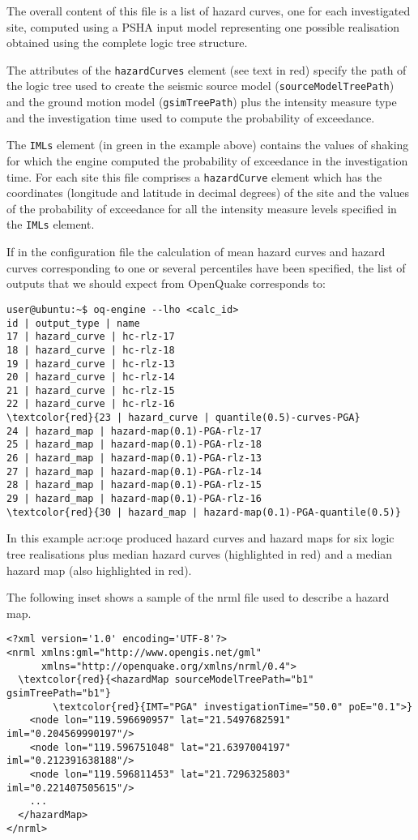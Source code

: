 The overall content of this file is a list of hazard curves, one for
each investigated site, computed using a PSHA input model representing
one possible realisation obtained using the complete logic tree structure. 

The attributes of the \texttt{hazardCurves} element (see text in 
red) specify the path of the logic tree 
used to create the seismic source model (\texttt{source\-Model\-TreePath}) 
and the ground motion model (\texttt{gsim\-Tree\-Path}) plus the 
intensity measure type and the investigation time used to compute 
the probability of exceedance. 

The \texttt{IMLs} element (in green in the example above) contains the 
values of shaking for which the engine computed the probability of 
exceedance in the investigation time.
For each site this file comprises a \texttt{hazardCurve} element which 
has the coordinates (longitude and latitude in decimal degrees) 
of the site and the values of the probability of exceedance for all the 
intensity measure levels specified in the \texttt{IMLs} element.

If in the configuration file the calculation of mean hazard curves 
and hazard curves corresponding to one or several percentiles have 
been specified, the list of outputs that we should expect from OpenQuake 
corresponds to:
\begin{Verbatim}[frame=single, commandchars=\\\{\}, fontsize=\small]
user@ubuntu:~$ oq-engine --lho <calc_id> 
id | output_type | name
17 | hazard_curve | hc-rlz-17
18 | hazard_curve | hc-rlz-18
19 | hazard_curve | hc-rlz-13
20 | hazard_curve | hc-rlz-14
21 | hazard_curve | hc-rlz-15
22 | hazard_curve | hc-rlz-16
\textcolor{red}{23 | hazard_curve | quantile(0.5)-curves-PGA}
24 | hazard_map | hazard-map(0.1)-PGA-rlz-17
25 | hazard_map | hazard-map(0.1)-PGA-rlz-18
26 | hazard_map | hazard-map(0.1)-PGA-rlz-13
27 | hazard_map | hazard-map(0.1)-PGA-rlz-14
28 | hazard_map | hazard-map(0.1)-PGA-rlz-15
29 | hazard_map | hazard-map(0.1)-PGA-rlz-16
\textcolor{red}{30 | hazard_map | hazard-map(0.1)-PGA-quantile(0.5)}
\end{Verbatim}
In this example \gls{acr:oqe} produced hazard curves and hazard maps for 
six logic tree realisations plus median hazard curves (highlighted in red)
and a median hazard map (also highlighted in red).

The following inset shows a sample of the nrml file used 
to describe a hazard map.
\begin{Verbatim}[frame=single, commandchars=\\\{\}, fontsize=\small]
<?xml version='1.0' encoding='UTF-8'?>
<nrml xmlns:gml="http://www.opengis.net/gml" 
      xmlns="http://openquake.org/xmlns/nrml/0.4">
  \textcolor{red}{<hazardMap sourceModelTreePath="b1" gsimTreePath="b1"}
        \textcolor{red}{IMT="PGA" investigationTime="50.0" poE="0.1">}
    <node lon="119.596690957" lat="21.5497682591" iml="0.204569990197"/>
    <node lon="119.596751048" lat="21.6397004197" iml="0.212391638188"/>
    <node lon="119.596811453" lat="21.7296325803" iml="0.221407505615"/>
    ...
  </hazardMap>
</nrml>
\end{Verbatim}